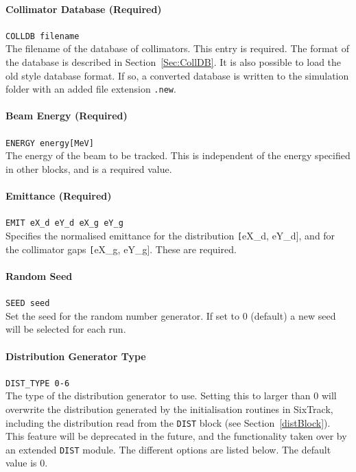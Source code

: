 \paragraph{Collimator Database (Required)} \texttt{COLLDB filename}\\

The filename of the database of collimators.
This entry is required.
The format of the database is described in Section~\ref{Sec:CollDB}.
It is also possible to load the old style database format.
If so, a converted database is written to the simulation folder with an added file extension \texttt{.new}.

\paragraph{Beam Energy (Required)} \texttt{ENERGY energy[MeV]}\\

The energy of the beam to be tracked.
This is independent of the energy specified in other blocks, and is a required value.

\paragraph{Emittance (Required)} \texttt{EMIT eX\_d eY\_d eX\_g eY\_g}\\

Specifies the normalised emittance for the distribution \texttt[eX\_d, eY\_d], and for the collimator gaps \texttt[eX\_g, eY\_g].
These are required.

\paragraph{Random Seed} \texttt{SEED seed}\\

Set the seed for the random number generator.
If set to 0 (default) a new seed will be selected for each run.

\paragraph{Distribution Generator Type} \texttt{DIST\_TYPE 0-6}\\

The type of the distribution generator to use.
Setting this to larger than 0 will overwrite the distribution generated by the initialisation routines in SixTrack, including the distribution read from the \texttt{DIST} block (see Section~\ref{distBlock}).
This feature will be deprecated in the future, and the functionality taken over by an extended \texttt{DIST} module.
The different options are listed below.
The default value is 0.


